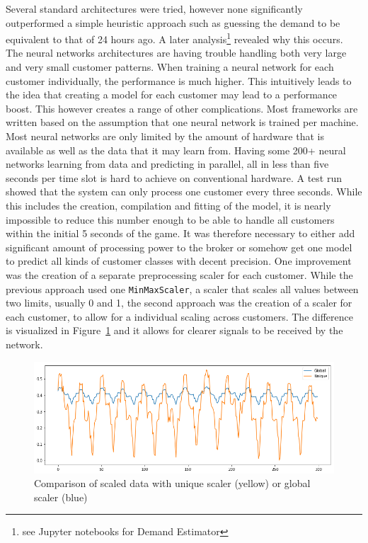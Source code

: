 Several standard architectures were tried, however none significantly outperformed a simple heuristic approach such as
guessing the demand to be equivalent to that of 24 hours ago. A later analysis\footnote{see Jupyter notebooks for Demand
Estimator}
revealed why this occurs. The neural networks architectures are having trouble handling both very large and very small
customer patterns. When training a neural network for each customer individually, the performance is much higher. This
intuitively leads to the idea that creating a model for each customer may lead to a performance boost. This however
creates a range of other complications. Most frameworks are written based on the assumption that one neural network is
trained per machine. Most neural networks are only limited by the amount of hardware that is available as well as the
data that it may learn from. Having some 200+ neural networks learning from data and predicting in parallel, all in
less than five seconds per time slot is hard to achieve on conventional hardware. A test run showed that the system can only
process one customer every three seconds. While this includes the creation, compilation and fitting of the model, it is
nearly impossible to reduce this number enough to be able to handle all customers within the initial 5 seconds of the
game. It was therefore necessary to either add significant amount of processing power to the broker or somehow get one
model to predict all kinds of customer classes with decent precision. One improvement was the creation of a separate
preprocessing scaler for each customer. While the previous approach used one \texttt{MinMaxScaler}, a scaler that scales
all values between two limits, usually 0 and 1, the second approach was the creation of a scaler for each customer, to
allow for a individual scaling across customers. The difference is visualized in Figure~\ref{fig:imgfrosty} and it
allows for clearer signals to be received by the network.


\begin{figure}[]
    \centering
    \includegraphics[width=1.0\linewidth]{img/frosty_scaled.png}
    \caption{Comparison of scaled data with unique scaler (yellow) or global scaler (blue)}
    \label{fig:imgfrosty}
\end{figure}

